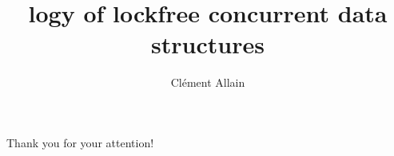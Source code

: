 \documentclass[serif]{beamer}
\title{
	\Zoo[]logy of lockfree concurrent data structures
}
\author{
	Clément Allain
}
\institute{
	INRIA Paris
}
\begin{document}

\begin{frame}
\titlepage
\end{frame}







\begin{frame}
\LARGE
\begin{center}
	Thank you for your attention!
\end{center}
\end{frame}

\end{document}
